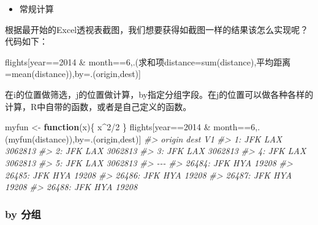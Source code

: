 \documentclass[
]{book}
\newenvironment{Shaded}{\begin{snugshade}}{\end{snugshade}}
\newcommand{\AttributeTok}[1]{\textcolor[rgb]{0.77,0.63,0.00}{#1}}
\newcommand{\CommentTok}[1]{\textcolor[rgb]{0.56,0.35,0.01}{\textit{#1}}}
\newcommand{\ControlFlowTok}[1]{\textcolor[rgb]{0.13,0.29,0.53}{\textbf{#1}}}
\newcommand{\DecValTok}[1]{\textcolor[rgb]{0.00,0.00,0.81}{#1}}
\newcommand{\FunctionTok}[1]{\textcolor[rgb]{0.00,0.00,0.00}{#1}}
\newcommand{\NormalTok}[1]{#1}
\newcommand{\OtherTok}[1]{\textcolor[rgb]{0.56,0.35,0.01}{#1}}
\newcommand{\SpecialCharTok}[1]{\textcolor[rgb]{0.00,0.00,0.00}{#1}}
\providecommand{\tightlist}{%
  \setlength{\itemsep}{0pt}\setlength{\parskip}{0pt}}
\begin{document}
\begin{itemize}
\tightlist
\item
  常规计算
\end{itemize}

根据最开始的Excel透视表截图，我们想要获得如截图一样的结果该怎么实现呢？代码如下：

\begin{Shaded}
\begin{Highlighting}[]
\NormalTok{flights[year}\SpecialCharTok{==}\DecValTok{2014} \SpecialCharTok{\&}\NormalTok{ month}\SpecialCharTok{==}\DecValTok{6}\NormalTok{,.(求和项}\AttributeTok{distance=}\FunctionTok{sum}\NormalTok{(distance),平均距离}\OtherTok{=}\FunctionTok{mean}\NormalTok{(distance)),by}\OtherTok{=}\NormalTok{.(origin,dest)]}
\end{Highlighting}
\end{Shaded}

在i的位置做筛选，j的位置做计算，by指定分组字段。在j的位置可以做各种各样的计算，R中自带的函数，或者是自己定义的函数。

\begin{Shaded}
\begin{Highlighting}[]
\NormalTok{myfun }\OtherTok{\textless{}{-}} \ControlFlowTok{function}\NormalTok{(x)\{}
\NormalTok{    x}\SpecialCharTok{\^{}}\DecValTok{2}\SpecialCharTok{/}\DecValTok{2}
\NormalTok{\}}
\NormalTok{flights[year}\SpecialCharTok{==}\DecValTok{2014} \SpecialCharTok{\&}\NormalTok{ month}\SpecialCharTok{==}\DecValTok{6}\NormalTok{,.(}\FunctionTok{myfun}\NormalTok{(distance)),by}\OtherTok{=}\NormalTok{.(origin,dest)]}
\CommentTok{\#\textgreater{}        origin dest      V1}
\CommentTok{\#\textgreater{}     1:    JFK  LAX 3062813}
\CommentTok{\#\textgreater{}     2:    JFK  LAX 3062813}
\CommentTok{\#\textgreater{}     3:    JFK  LAX 3062813}
\CommentTok{\#\textgreater{}     4:    JFK  LAX 3062813}
\CommentTok{\#\textgreater{}     5:    JFK  LAX 3062813}
\CommentTok{\#\textgreater{}    {-}{-}{-}                    }
\CommentTok{\#\textgreater{} 26484:    JFK  HYA   19208}
\CommentTok{\#\textgreater{} 26485:    JFK  HYA   19208}
\CommentTok{\#\textgreater{} 26486:    JFK  HYA   19208}
\CommentTok{\#\textgreater{} 26487:    JFK  HYA   19208}
\CommentTok{\#\textgreater{} 26488:    JFK  HYA   19208}
\end{Highlighting}
\end{Shaded}

\hypertarget{by-ux5206ux7ec4}{%
\subsubsection{by 分组}\label{by-ux5206ux7ec4}}
\end{document}
